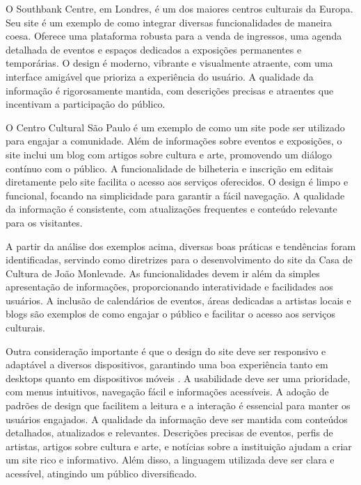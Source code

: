O Southbank Centre, em Londres, é um dos maiores centros culturais da Europa. Seu site é um exemplo de como integrar diversas funcionalidades de maneira coesa. Oferece uma plataforma robusta para a venda de ingressos, uma agenda detalhada de eventos e espaços dedicados a exposições permanentes e temporárias. O design é moderno, vibrante e visualmente atraente, com uma interface amigável que prioriza a experiência do usuário. A qualidade da informação é rigorosamente mantida, com descrições precisas e atraentes que incentivam a participação do público.

O Centro Cultural São Paulo é um exemplo de como um site pode ser utilizado para engajar a comunidade. Além de informações sobre eventos e exposições, o site inclui um blog com artigos sobre cultura e arte, promovendo um diálogo contínuo com o público. A funcionalidade de bilheteria e inscrição em editais diretamente pelo site facilita o acesso aos serviços oferecidos. O design é limpo e funcional, focando na simplicidade para garantir a fácil navegação. A qualidade da informação é consistente, com atualizações frequentes e conteúdo relevante para os visitantes.

A partir da análise dos exemplos acima, diversas boas práticas e tendências foram identificadas, servindo como diretrizes para o desenvolvimento do site da Casa de Cultura de João Monlevade. As funcionalidades devem ir além da simples apresentação de informações, proporcionando interatividade e facilidades aos usuários. A inclusão de calendários de eventos, áreas dedicadas a artistas locais e blogs são exemplos de como engajar o público e facilitar o acesso aos serviços culturais.

Outra consideração importante é que o design do site deve ser responsivo e adaptável a diversos dispositivos, garantindo uma boa experiência tanto em desktops quanto em dispositivos móveis \cite{almeida2017role}. A usabilidade deve ser uma prioridade, com menus intuitivos, navegação fácil e informações acessíveis. A adoção de padrões de design que facilitem a leitura e a interação é essencial para manter os usuários engajados. A qualidade da informação deve ser mantida com conteúdos detalhados, atualizados e relevantes. Descrições precisas de eventos, perfis de artistas, artigos sobre cultura e arte, e notícias sobre a instituição ajudam a criar um site rico e informativo. Além disso, a linguagem utilizada deve ser clara e acessível, atingindo um público diversificado.
